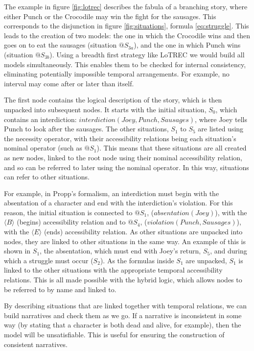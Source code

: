 \documentclass{llncs}
\begin{document}
The example in figure \ref{fig:lotrec} describes the fabula of a branching story, where either Punch or the Crocodile may win the fight for the sausages. This corresponds to the disjunction in figure \ref{fig:situations}, formula \ref{eq:struggle}. This leads to the creation of two models: the one in which the Crocodile wins and then goes on to eat the sausages (situation $@S_{3a}$), and the one in which Punch wins (situation $@S_{3b}$).
Using a breadth first strategy like LoTREC we would build all models simultaneously. This enables them to be checked for internal consistency, eliminating potentially impossible temporal arrangements. For example, no interval may come after or later than itself.

The first node contains the logical description of the story, which is then unpacked into subsequent nodes. It starts with the initial situation, $S_0$, which contains an interdiction: $\mathit{interdiction(Joey, Punch, Sausages)}$, where Joey tells Punch to look after the sausages. The other situations, $S_1$ to $S_5$ are listed using the necessity operator, with their accessibility relations being each situation's nominal operator (such as $@S_1$). This means that these situations are all created as new nodes, linked to the root node using their nominal accessibility relation, and so can be referred to later using the nominal operator. In this way, situations can refer to other situations.

For example, in Propp's formalism, an interdiction must begin with the absentation of a character and end with the interdiction's violation. For this reason, the initial situation is connected to $@S_1$, ($\mathit{absentation(Joey)}$), with the $\langle B \rangle$ (begins) accessibility relation and to $@S_4$, ($\mathit{violation(Punch, Sausages)}$), with the $\langle E \rangle$ (ends) accessibility relation. As other situations are unpacked into nodes, they are linked to other situations in the same way. An example of this is shown in $S_1$, the absentation, which must end with Joey's return, $S_5$, and during which a struggle must occur ($S_2$). As the formulas inside $S_1$ are unpacked, $S_1$ is linked to the other situations with the appropriate temporal accessibility relations. This is all made possible with the hybrid logic, which allows nodes to be referred to by name and linked to.

By describing situations that are linked together with temporal relations, we can build narratives and check them as we go. If a narrative is inconsistent in some way (by stating that a character is both dead and alive, for example), then the model will be unsatisfiable. This is useful for ensuring the construction of consistent narratives.
\end{document}
